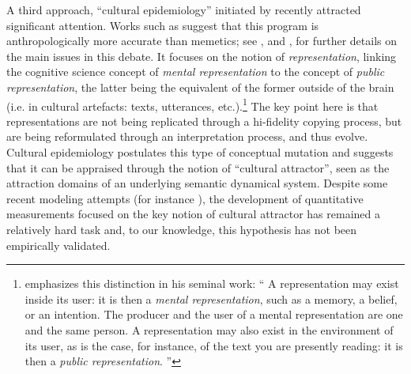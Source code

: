A third approach, ``cultural epidemiology'' initiated by \citet{sper:expl} recently attracted significant attention. Works such as \citet{Atran03} suggest that this program is anthropologically more accurate than memetics; see \citet{Kuper00}, and \citet{Bloch00}, for further details on the main issues in this debate.
It focuses on the notion of \emph{representation}, linking the cognitive science concept of \emph{mental representation} to the concept of \emph{public representation}, the latter being the equivalent of the former outside of the brain (\hbox{i.e.} in cultural artefacts: texts, utterances, etc.).\footnote{\citet{sper:expl} emphasizes this distinction in his seminal work:
{%
``%
A representation may exist inside its user: it is then a \emph{mental representation}, such as a memory, a belief, or an intention. The producer and the user of a mental representation are one and the same person.  A representation may also exist in the environment of its user, as is the case, for instance, of the text you are presently reading: it is then a \emph{public representation}.}%
''
}
The key point here is that representations are not being replicated through a hi-fidelity copying process, but are being reformulated through an interpretation process, and thus evolve. Cultural epidemiology postulates this type of conceptual mutation and suggests that it can be appraised through the notion of ``cultural attractor'', seen as the attraction domains of an underlying semantic dynamical system.
Despite some recent modeling attempts (for instance \citet{Claidiere07}), the development of quantitative measurements focused on the key notion of cultural attractor has remained a relatively hard task and, to our knowledge, this hypothesis has not been empirically validated.


